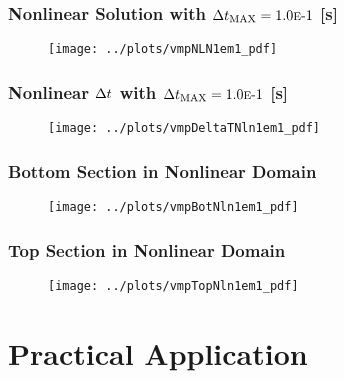\documentclass[compress,xcolor=table]{beamer}
\begin{document}
\begin{frame}
\frametitle{Nonlinear Solution with $\dtmax{} = \expneg{1.0}{1}$ [s]}

\begin{figure}[h!t]
\centering
\texttt{[image: ../plots/vmpNLN1em1\_pdf]}
\end{figure}

\end{frame}
\begin{frame}
\frametitle{Nonlinear $\dt{}$ with $\dtmax{} = \expneg{1.0}{1}$ [s]}

\begin{figure}[h!t]
\centering
\texttt{[image: ../plots/vmpDeltaTNln1em1\_pdf]}
\end{figure}

\end{frame}
\begin{frame}
\frametitle{Bottom Section in Nonlinear Domain}

\begin{figure}[h!t]
\centering
\texttt{[image: ../plots/vmpBotNln1em1\_pdf]}
\end{figure}

\end{frame}
\begin{frame}
\frametitle{Top Section in Nonlinear Domain}

\begin{figure}[h!t]
\centering
\texttt{[image: ../plots/vmpTopNln1em1\_pdf]}
\end{figure}

\end{frame}
\section[Practical Applications]{Practical Application}
\end{document}

